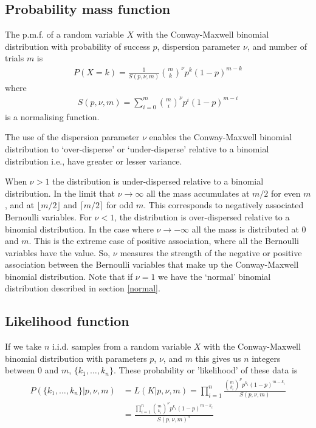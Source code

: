 \documentclass[a4paper,12pt]{article}
\theoremstyle{definition}
\begin{document}
\subsection{Probability mass function}
The p.m.f. of a random variable $X$ with the Conway-Maxwell binomial distribution with probability of success $p$, dispersion parameter $\nu$, and number of trials $m$ is
\begin{align}
  P(X = k) = \frac{1}{S(p, \nu, m)} \binom{m}{k}^{\nu} p^{k} (1-p)^{m-k}
\end{align}
where 
\begin{align}
  S(p, \nu, m) = \sum_{i=0}^{m} \binom{m}{i}^{\nu} p^{i} (1-p)^{m-i}
\end{align}
is a normalising function. 

The use of the dispersion parameter $\nu$ enables the Conway-Maxwell binomial distribution to `over-disperse' or `under-disperse' relative to a binomial distribution i.e., have greater or lesser variance.

When $\nu > 1$ the distribution is under-dispersed relative to a binomial distribution. In the limit that $\nu \rightarrow \infty$ all the mass accumulates at $m/2$ for even $m$, and at $\lfloor m/2 \rfloor$ and $\lceil m/2 \rceil$ for odd $m$. This corresponds to negatively associated Bernoulli variables. For $\nu < 1$, the distribution is over-dispersed relative to a binomial distribution. In the case where $\nu \rightarrow -\infty$ all the mass is distributed at $0$ and $m$. This is the extreme case of positive association, where all the Bernoulli variables have the value. So, $\nu$ measures the strength of the negative or positive association between the Bernoulli variables that make up the Conway-Maxwell binomial distribution. Note that if $\nu =1$ we have the `normal' binomial distribution described in section \ref{normal}.

\subsection{Likelihood function}
If we take $n$ i.i.d. samples from a random variable $X$ with the Conway-Maxwell binomial distribution with parameters $p$, $\nu$, and $m$ this gives us $n$ integers between $0$ and $m$, $\lbrace k_1, \dots , k_n \rbrace$. These probability or 'likelihood' of these data is
\begin{align}
  P(\lbrace k_1, \dots, k_n \rbrace | p, \nu, m) &= L(K | p, \nu, m) = \prod_{i=1}^{n} \frac{\binom{m}{k_i}^{\nu} p^{k_i} (1-p)^{m-k_i}}{S(p, \nu, m)} \\ 
  & = \frac{\prod_{i=1}^{n} \binom{m}{k_i}^{\nu} p^{k_i} (1-p)^{m-k_i}}{S(p, \nu, m)^n}
\end{align}
\end{document}
